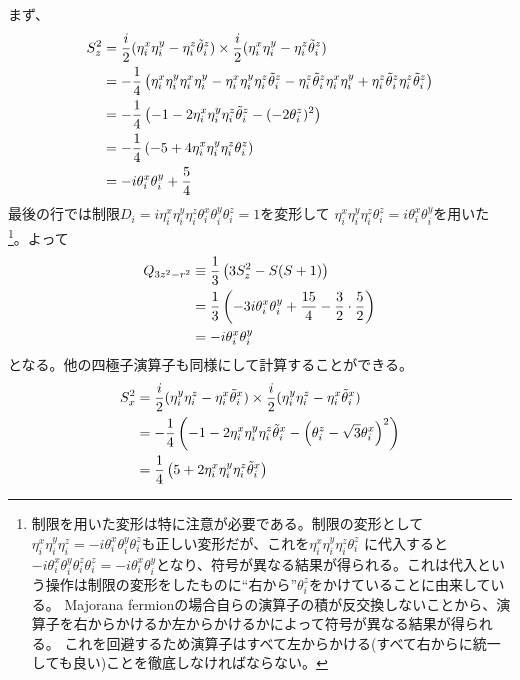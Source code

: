 \documentclass[11pt, aps, longbibliography]{article}
\begin{document}
        まず、
        \begin{align}\label{eq:app-MajoranaMF-1}
            S_z^2 &= \frac{i}{2}(\eta_i^x\eta_i^y - \eta_i^z\tilde{\theta}_i^z) \times \frac{i}{2}(\eta_i^x\eta_i^y - \eta_i^z\tilde{\theta}_i^z) \notag \\
            &= -\frac{1}{4}\left( \eta_i^x\eta_i^y\eta_i^x\eta_i^y - \eta_i^x\eta_i^y\eta_i^z\tilde{\theta}_i^z - \eta_i^z\tilde{\theta}_i^z\eta_i^x\eta_i^y + \eta_i^z\tilde{\theta}_i^z\eta_i^z\tilde{\theta}_i^z \right) \notag \\
            &= -\frac{1}{4}\left( -1 -2\eta_i^x\eta_i^y\eta_i^z\tilde{\theta}_i^z - (-2\theta_i^z)^2 \right) \notag \\
            &= -\frac{1}{4}\left( -5 +4\eta_i^x\eta_i^y\eta_i^z\theta_i^z \right) \notag \\
            &= -i\theta_i^x\theta_i^y + \frac{5}{4}
        \end{align}
        最後の行では制限$D_i = i\eta_i^x\eta_i^y\eta_i^z\theta_i^x\theta_i^y\theta_i^z = 1$を変形して
        $\eta_i^x\eta_i^y\eta_i^z\theta_i^z = i\theta_i^x\theta_i^y$を用いた
        \footnote{制限を用いた変形は特に注意が必要である。制限の変形として$\eta_i^x\eta_i^y\eta_i^z = -i\theta_i^x\theta_i^y\theta_i^z$も正しい変形だが、これを$\eta_i^x\eta_i^y\eta_i^z\theta_i^z$
        に代入すると$-i\theta_i^x\theta_i^y\theta_i^z\theta_i^z = -i\theta_i^x\theta_i^y $となり、符号が異なる結果が得られる。これは代入という操作は制限の変形をしたものに``右から''$\theta_i^z$をかけていることに由来している。
        Majorana fermionの場合自らの演算子の積が反交換しないことから、演算子を右からかけるか左からかけるかによって符号が異なる結果が得られる。
        これを回避するため演算子はすべて左からかける(すべて右からに統一しても良い)ことを徹底しなければならない。}。よって
        \begin{align}\label{eq:app-MajoranaMF-2}
            Q_{3z^2-r^2} &\equiv \frac{1}{3} \left(3S_z^2 - S(S+1)\right) \notag \\
            &=  \frac{1}{3} \left( -3i\theta_i^x\theta_i^y + \frac{15}{4} - \frac{3}{2}\cdot\frac{5}{2} \right) \notag \\
            &= -i\theta_i^x\theta_i^y
        \end{align}
        となる。他の四極子演算子も同様にして計算することができる。
        \begin{align}\label{eq:app-MajoranaMF-3}
            S_x^2 &= \frac{i}{2}(\eta_i^y\eta_i^z - \eta_i^x\tilde{\theta}_i^x) \times \frac{i}{2}(\eta_i^y\eta_i^z - \eta_i^x\tilde{\theta}_i^x) \notag \\
            &= -\frac{1}{4} \left( -1 -2\eta_i^x\eta_i^y\eta_i^z\tilde{\theta}_i^x - \left(\theta_i^z - \sqrt{3}\theta_i^x\right)^2 \right) \notag \\
            &= \frac{1}{4} \left( 5 + 2\eta_i^x\eta_i^y\eta_i^z\tilde{\theta}_i^x  \right)
        \end{align}
\end{document}
